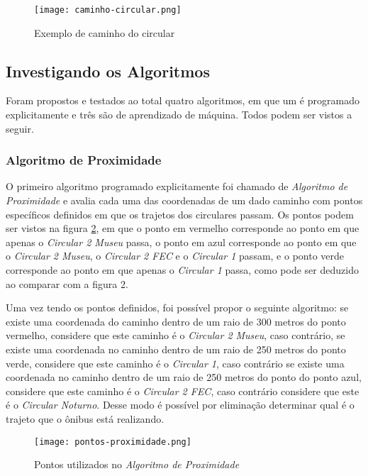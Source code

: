\documentclass[11pt,twoside]{article}
\begin{document}
\begin{figure}
    \centering
    \texttt{[image: caminho-circular.png]}
    \caption{Exemplo de caminho do circular}
    \label{fig:caminho-circular}
\end{figure}

\subsection{Investigando os Algoritmos}

Foram propostos e testados ao total quatro algoritmos, em que um é programado explicitamente e três são de aprendizado de máquina. Todos podem ser vistos a seguir.

\subsubsection{Algoritmo de Proximidade}

O primeiro algoritmo programado explicitamente foi chamado de \emph{Algoritmo de Proximidade} e avalia cada uma das coordenadas de um dado caminho com pontos específicos definidos em que os trajetos dos circulares passam. Os pontos podem ser vistos na figura \ref{fig:pontos-proximidade}, em que o ponto em vermelho corresponde ao ponto em que apenas o \emph{Circular 2 Museu} passa, o ponto em azul corresponde ao ponto em que o \emph{Circular 2 Museu}, o \emph{Circular 2 FEC} e o \emph{Circular 1} passam, e o ponto verde corresponde ao ponto em que apenas o \emph{Circular 1} passa, como pode ser deduzido ao comparar com a figura 2.

Uma vez tendo os pontos definidos, foi possível propor o seguinte algoritmo: se existe uma coordenada do caminho dentro de um raio de 300 metros do ponto vermelho, considere que este caminho é o \emph{Circular 2 Museu}, caso contrário, se existe uma coordenada no caminho dentro de um raio de 250 metros do ponto verde, considere que este caminho é o \emph{Circular 1}, caso contrário se existe uma coordenada no caminho dentro de um raio de 250 metros do ponto do ponto azul, considere que este caminho é o \emph{Circular 2 FEC}, caso contrário considere que este é o \emph{Circular Noturno}. Desse modo é possível por eliminação determinar qual é o trajeto que o ônibus está realizando.

\begin{figure}
    \centering
    \texttt{[image: pontos-proximidade.png]}
    \caption{Pontos utilizados no \emph{Algoritmo de Proximidade}}
    \label{fig:pontos-proximidade}
\end{figure}
\end{document}
